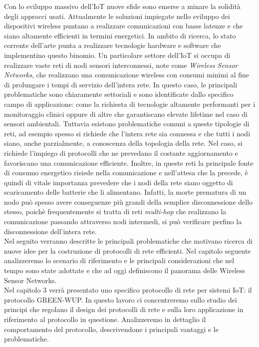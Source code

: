 \documentclass[binding=0.6cm,TFA]{sapthesis}
\begin{document}
Con lo sviluppo massivo dell'IoT nuove sfide sono emerse a minare la solidità degli approcci usati. Attualmente le soluzioni impiegate nello sviluppo
dei dispositivi wireless puntano a realizzare comunicazioni con basse latenze e che siano altamente efficienti in termini energetici. In ambito di ricerca,
lo stato corrente dell'arte punta a realizzare tecnologie hardware e software che implementino questo binomio. Un particolare
settore dell'IoT si occupa di realizzare vaste reti di nodi sensori interconnessi, note come \emph{Wireless Sensor Networks},
che realizzano una comunicazione wireless con consumi minimi al fine di prolungare i tempi di servizio dell'intera rete. In questo caso,
le principali problematiche sono chiaramente settoriali e sono identificate dallo specifico campo di applicazione: come la richiesta di tecnologie
altamente performanti per i monitoraggio clinici oppure di altre che garantiscano elevate lifetime nel caso di sensori ambientali. Tuttavia esistono
problematiche comuni a queste tipologie di reti, ad esempio spesso si richiede che l'intera rete sia connessa e che tutti i nodi siano,
anche parzialmente, a conoscenza della topologia della rete. Nel caso, si richiede l'impiego di protocolli che ne prevedano il
costante aggiornamento e favoriscano una comunicazione efficiente. Inoltre, in queste reti la principale fonte di consumo energetico risiede
nella comunicazione e nell'attesa che la precede, è quindi di vitale importanza prevedere che i nodi della rete siano
oggetto di scaricamento delle batterie che li alimentano. Infatti, la morte prematura di un nodo può spesso avere conseguenze più grandi della semplice
disconnessione dello stesso, poichè frequentemente si tratta di reti \emph{multi-hop} che realizzano la comunicazione passando attraverso nodi intermedi, si può
verificare perfino la disconnessione dell'intera rete.\\

Nel seguito verranno descritte le principali problematiche che motivano ricerca di nuove idee per la costruzione di protocolli di rete efficienti.
Nel capitolo seguente analizzeremo lo scenario di riferimento e le principali considerazioni che nel tempo sono state adottate e che ad oggi
definiscono il panorama delle Wireless Sensor Networks.\\

Nel capitolo 3 verrà presentato uno specifico protocollo di rete per sistemi IoT: il protocollo GREEN-WUP. In questo lavoro ci concentreremo sullo
studio dei principi che regolano il design dei protocolli di rete e sulla loro applicazione in riferimento al protocollo in questione. Analizzeremo
in dettaglio il comportamento del protocollo, descrivendone i principali vantaggi e le problematiche.\\
\end{document}
